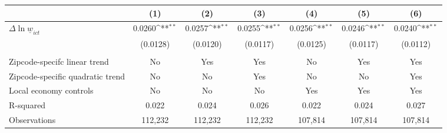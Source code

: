 {
\def\sym#1{\ifmmode^{#1}\else\(^{#1}\)\fi}
\begin{tabular}{l*{6}{c}}
\hline\hline
          &\multicolumn{1}{c}{(1)}         &\multicolumn{1}{c}{(2)}         &\multicolumn{1}{c}{(3)}         &\multicolumn{1}{c}{(4)}         &\multicolumn{1}{c}{(5)}         &\multicolumn{1}{c}{(6)}         \\
\hline
$\Delta \ln \underline{w}_{ict}$&   0.0260\sym{**} &   0.0257\sym{**} &   0.0255\sym{**} &   0.0256\sym{**} &   0.0246\sym{**} &   0.0240\sym{**} \\
          & (0.0128)         & (0.0120)         & (0.0117)         & (0.0125)         & (0.0117)         & (0.0112)         \\
\hline
\vspace{-2mm}&                  &                  &                  &                  &                  &                  \\
Zipcode-specifc linear trend&       No         &      Yes         &      Yes         &       No         &      Yes         &      Yes         \\
Zipcode-specific quadratic trend&       No         &       No         &      Yes         &       No         &       No         &      Yes         \\
Local economy controls&       No         &       No         &       No         &      Yes         &      Yes         &      Yes         \\
R-squared &    0.022         &    0.024         &    0.026         &    0.022         &    0.024         &    0.027         \\
Observations&  112,232         &  112,232         &  112,232         &  107,814         &  107,814         &  107,814         \\
\hline\hline
\end{tabular}
}
